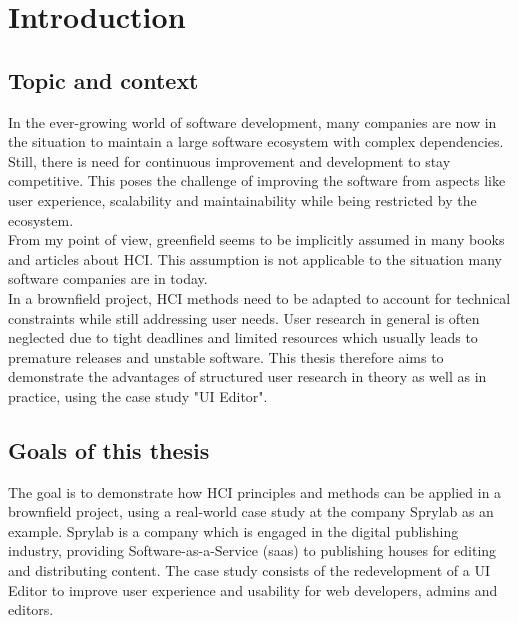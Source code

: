 %
\chapter{Introduction}
\label{chap:introduction}

\section{Topic and context}

In the ever-growing world of software development, many companies are now in the situation to maintain a large software ecosystem with complex dependencies.
Still, there is need for continuous improvement and development to stay competitive.
This poses the challenge of improving the software from aspects like user experience, scalability and maintainability while being restricted by the ecosystem.
\\
From my point of view, \Gls{greenfield} seems to be implicitly assumed in many books and articles about HCI.
This assumption is not applicable to the situation many software companies are in today.
\\
In a \Gls{brownfield} project, HCI methods need to be adapted to account for technical constraints while still addressing user needs.
User research in general is often neglected due to tight deadlines and limited resources which usually leads to premature releases and unstable software.
This thesis therefore aims to demonstrate the advantages of structured user research in theory as well as in practice, using the case study "UI Editor".

\section{Goals of this thesis}
The goal is to demonstrate how HCI principles and methods can be applied in a brownfield project, using a real-world case study at the company Sprylab as an example.
Sprylab is a company which is engaged in the digital publishing industry, providing Software-as-a-Service (\Gls{saas}) to publishing houses for editing and distributing content.
The case study consists of the redevelopment of a UI Editor to improve user experience and usability for web developers, admins and editors.

